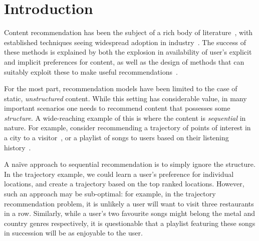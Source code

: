 
\secmoveup
\section{Introduction}
\label{sec:intro}
\textmoveup

Content recommendation has been the subject of a rich body of literature~\citep{Goldberg:1992,Sarwar:2001,Koren:2010},
with established techniques seeing widespread adoption in industry~\citep{Linden:2003,Agarwal:2013,Amatriain:2015,Gomez-Uribe:2015}.
The success of these methods is explained by both the explosion in availability of user's explicit and implicit preferences for content,
as well as the design of methods that can suitably exploit these to make useful recommendations~\citep{Koren:2009}.

For the most part, recommendation models have been limited to the case of static, \emph{unstructured} content.
While this setting has considerable value,
in many important scenarios one needs to recommend content that possesses some \emph{structure}.
A wide-reaching example of this is where the content is \emph{sequential} in nature.
For example, consider %
recommending a trajectory of points of interest in a city to a visitor~\citep{lu2010photo2trip,lu2012personalized,ijcai15,cikm16paper},
or
a playlist of songs to users based on their listening history~\citep{McFee:2011,chen2012playlist,hidasi2015session,choi2016towards}.

A na\"{i}ve approach to sequential recommendation is to simply ignore the structure.
In the trajectory example, we could learn a user's preference for individual locations,
and create a trajectory based on the top ranked locations.
However, such an approach may be sub-optimal:
for example,
in the trajectory recommendation problem, it is unlikely a user will want to visit three restaurants in a row.
Similarly, 
while a user's two favourite songs might belong
the metal and country genres respectively,
it is questionable that a playlist featuring these songs in succession will be as enjoyable to the user.


